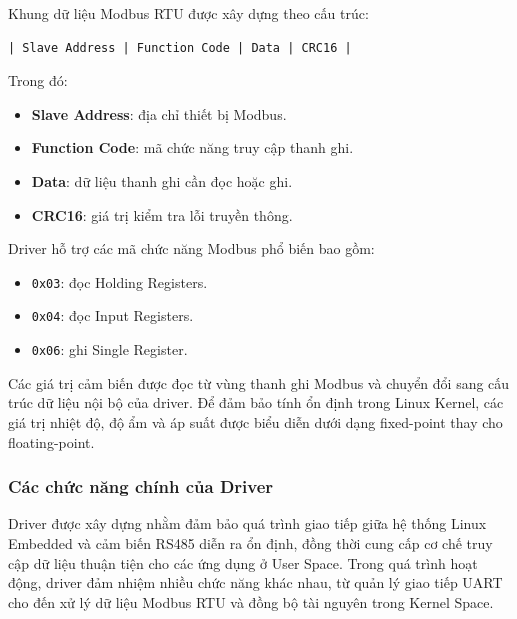 Khung dữ liệu Modbus RTU được xây dựng theo cấu trúc:

\begin{center}
\begin{verbatim}
| Slave Address | Function Code | Data | CRC16 |
\end{verbatim}
\end{center}

Trong đó:
\begin{itemize}
    \item \textbf{Slave Address}: địa chỉ thiết bị Modbus.
    
    \item \textbf{Function Code}: mã chức năng truy cập thanh ghi.
    
    \item \textbf{Data}: dữ liệu thanh ghi cần đọc hoặc ghi.
    
    \item \textbf{CRC16}: giá trị kiểm tra lỗi truyền thông.
\end{itemize}

Driver hỗ trợ các mã chức năng Modbus phổ biến bao gồm:
\begin{itemize}
    \item \texttt{0x03}: đọc Holding Registers.
    
    \item \texttt{0x04}: đọc Input Registers.
    
    \item \texttt{0x06}: ghi Single Register.
\end{itemize}

Các giá trị cảm biến được đọc từ vùng thanh ghi Modbus và chuyển đổi sang cấu trúc dữ liệu nội bộ của driver. Để đảm bảo tính ổn định trong Linux Kernel, các giá trị nhiệt độ, độ ẩm và áp suất được biểu diễn dưới dạng fixed-point thay cho floating-point.

\subsubsection{Các chức năng chính của Driver}

Driver được xây dựng nhằm đảm bảo quá trình giao tiếp giữa hệ thống Linux Embedded và cảm biến RS485 diễn ra ổn định, đồng thời cung cấp cơ chế truy cập dữ liệu thuận tiện cho các ứng dụng ở User Space. Trong quá trình hoạt động, driver đảm nhiệm nhiều chức năng khác nhau, từ quản lý giao tiếp UART cho đến xử lý dữ liệu Modbus RTU và đồng bộ tài nguyên trong Kernel Space.

